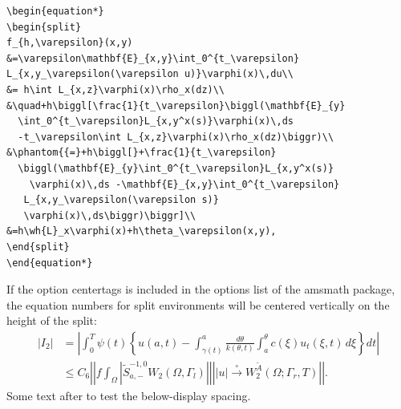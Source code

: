 \documentclass{article}
\newcommand{\ntt}{\normalfont\ttfamily}
\newcommand{\pkg}[1]{{\protect\ntt#1}}
\newcommand{\env}[1]{{\protect\ntt#1}}
\theoremstyle{definition}
\theoremstyle{remark}
\newcommand{\wt}{\widetilde}
\newcommand{\wh}{\widehat}
\newcommand{\envert}[1]{\left\lvert#1\right\rvert}
\let\abs=\envert
\begin{document}
\begin{verbatim}
\begin{equation*}
\begin{split}
f_{h,\varepsilon}(x,y)
&=\varepsilon\mathbf{E}_{x,y}\int_0^{t_\varepsilon}
L_{x,y_\varepsilon(\varepsilon u)}\varphi(x)\,du\\
&= h\int L_{x,z}\varphi(x)\rho_x(dz)\\
&\quad+h\biggl[\frac{1}{t_\varepsilon}\biggl(\mathbf{E}_{y}
  \int_0^{t_\varepsilon}L_{x,y^x(s)}\varphi(x)\,ds
  -t_\varepsilon\int L_{x,z}\varphi(x)\rho_x(dz)\biggr)\\
&\phantom{{=}+h\biggl[}+\frac{1}{t_\varepsilon}
  \biggl(\mathbf{E}_{y}\int_0^{t_\varepsilon}L_{x,y^x(s)}
    \varphi(x)\,ds -\mathbf{E}_{x,y}\int_0^{t_\varepsilon}
   L_{x,y_\varepsilon(\varepsilon s)}
   \varphi(x)\,ds\biggr)\biggr]\\
&=h\wh{L}_x\varphi(x)+h\theta_\varepsilon(x,y),
\end{split}
\end{equation*}
\end{verbatim}

\newpage
If the option \env{centertags} is included in the options
list of the \pkg{amsmath} package,
the equation numbers for \env{split} environments will be
centered vertically on the height
of  the \env{split}:
{\makeatletter\ctagsplit@true
\begin{equation}
\begin{split}
 \abs{I_2}&=\left\lvert \int_{0}^T \psi(t)\left\{u(a,t)-\int_{\gamma(t)}^a
  \frac{d\theta}{k(\theta,t)}
  \int_{a}^\theta c(\xi)u_t(\xi,t)\,d\xi\right\}dt\right\rvert\\
&\le C_6\left\lvert \left\lvert f\int_\Omega\left\lvert \wt{S}^{-1,0}_{a,-}
  W_2(\Omega,\Gamma_l)\right\rvert\right\rvert
  \left\lvert \abs{u}\overset{\circ}\to W_2^{\wt{A}}
  (\Omega;\Gamma_r,T)\right\rvert\right\rvert.
\end{split}
\end{equation}}%
Some text after to test the below-display spacing.

\end{document}
